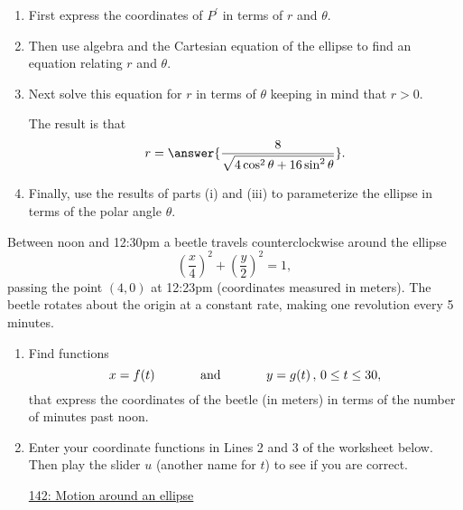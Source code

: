 \documentclass{ximera}
\begin{document}
\begin{example}
\begin{enumerate}


\begin{enumerate}
\item First express the coordinates of $P^\prime$ in terms of $r$ and $\theta$.

\item Then use algebra and the Cartesian equation of the ellipse to find an equation relating $r$ and $\theta$.

\item Next solve this equation for $r$ in terms of $\theta$ keeping in mind that $r>0$.

The result is that
\[
  r = \answer{\frac{8}{\sqrt{4\cos^2\theta + 16\sin^2\theta }}} .
\]

\item Finally, use the results of parts (i) and (iii) to parameterize the ellipse in terms of the polar angle $\theta$.
\end{enumerate}

\end{enumerate}
\end{example}

\begin{example} \label{Ex:8UDUREGDFGD}
Between noon and 12:30pm a beetle travels counterclockwise around the ellipse
\[
         \left(  \frac{x}{4} \right)^2 + \left(  \frac{y}{2} \right)^2  = 1 ,
\]
passing the point $(4,0)$ at 12:23pm (coordinates measured in meters). The beetle rotates about the origin at a constant rate, making one revolution every 5 minutes. 

\begin{enumerate}

\item Find functions
\[
    x = f(t)  \hskip 0.5 in \text{and} \hskip 0.5 in y=g(t) \, , \, 0\leq t \leq 30 ,
\]
that express the coordinates of the beetle (in meters) in terms of the number of minutes past noon.

\item Enter your coordinate functions in Lines 2 and 3 of the worksheet below. Then play the slider $u$ (another name for $t$) to see if you are correct.

\begin{onlineOnly}
    \begin{center}
\end{center}
\end{onlineOnly}

\href{https://www.desmos.com/calculator/goeo2vvdvi}{142: Motion around an ellipse}




\end{enumerate}
\end{example}
\end{document}
